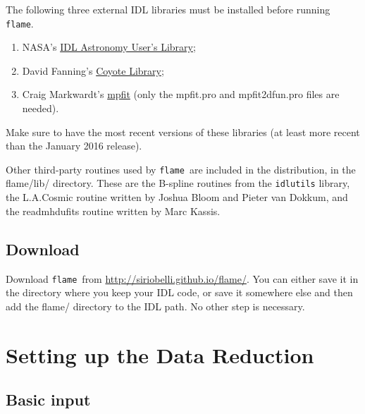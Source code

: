 \documentclass[a4paper, notitlepage]{article}
\newcommand{\flame}{\texttt{flame}}
\begin{document}
The following three external IDL libraries must be installed before running \flame.
\begin{enumerate}
\item NASA's \href{http://idlastro.gsfc.nasa.gov/}{IDL Astronomy User's Library};
\item David Fanning's \href{http://www.idlcoyote.com/code_tips/installcoyote.php}{Coyote Library};
\item Craig Markwardt's \href{https://www.physics.wisc.edu/~craigm/idl/fitting.html}{mpfit} (only the mpfit.pro and mpfit2dfun.pro files are needed).
\end{enumerate}
Make sure to have the most recent versions of these libraries (at least more recent than the January 2016 release).

Other third-party routines used by \flame\ are included in the distribution, in the flame/lib/ directory. These are the B-spline routines from the \texttt{idlutils} library, the L.A.Cosmic routine written by Joshua Bloom and Pieter van Dokkum, and the readmhdufits routine written by Marc Kassis.


\subsection{Download}

Download \flame\ from \url{http://siriobelli.github.io/flame/}. You can either save it in the directory where you keep your IDL code, or save it somewhere else and then add the flame/ directory to the IDL path. No other step is necessary.








\section{Setting up the Data Reduction}
\label{sec:setup}


\subsection{Basic input}
\end{document}
